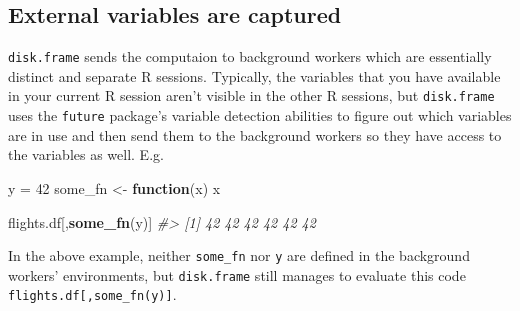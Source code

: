\documentclass[]{book}
\newenvironment{Shaded}{\begin{snugshade}}{\end{snugshade}}
\newcommand{\CommentTok}[1]{\textcolor[rgb]{0.56,0.35,0.01}{\textit{#1}}}
\newcommand{\ControlFlowTok}[1]{\textcolor[rgb]{0.13,0.29,0.53}{\textbf{#1}}}
\newcommand{\DecValTok}[1]{\textcolor[rgb]{0.00,0.00,0.81}{#1}}
\newcommand{\KeywordTok}[1]{\textcolor[rgb]{0.13,0.29,0.53}{\textbf{#1}}}
\newcommand{\NormalTok}[1]{#1}
\newcommand{\StringTok}[1]{\textcolor[rgb]{0.31,0.60,0.02}{#1}}
\begin{document}
\hypertarget{external-variables-are-captured}{%
\subsection{External variables are captured}\label{external-variables-are-captured}}

\texttt{disk.frame} sends the computaion to background workers which are essentially distinct and separate R sessions. Typically, the variables that you have available in your current R session aren't visible in the other R sessions, but \texttt{disk.frame} uses the \texttt{future} package's variable detection abilities to figure out which variables are in use and then send them to the background workers so they have access to the variables as well. E.g.

\begin{Shaded}
\begin{Highlighting}[]
\NormalTok{y =}\StringTok{ }\DecValTok{42} 
\NormalTok{some_fn <-}\StringTok{ }\ControlFlowTok{function}\NormalTok{(x) x}


\NormalTok{flights.df[,}\KeywordTok{some_fn}\NormalTok{(y)]}
\CommentTok{#> [1] 42 42 42 42 42 42}
\end{Highlighting}
\end{Shaded}

In the above example, neither \texttt{some\_fn} nor \texttt{y} are defined in the background workers' environments, but \texttt{disk.frame} still manages to evaluate this code \texttt{flights.df{[},some\_fn(y){]}}.


\end{document}
